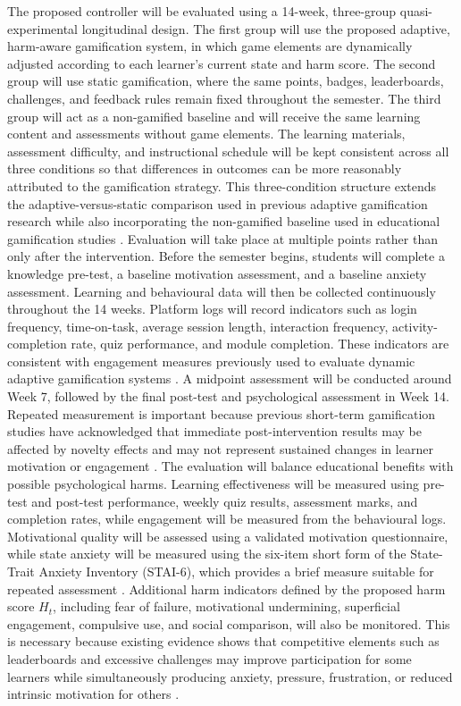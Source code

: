 \documentclass[12pt,a4paper]{article}
\begin{document}
\begin{justify}
The proposed controller will be evaluated using a 14-week, three-group quasi-experimental longitudinal design. The first group will use the proposed adaptive, harm-aware gamification system, in which game elements are dynamically adjusted according to each learner's current state and harm score. The second group will use static gamification, where the same points, badges, leaderboards, challenges, and feedback rules remain fixed throughout the semester. The third group will act as a non-gamified baseline and will receive the same learning content and assessments without game elements. The learning materials, assessment difficulty, and instructional schedule will be kept consistent across all three conditions so that differences in outcomes can be more reasonably attributed to the gamification strategy. This three-condition structure extends the adaptive-versus-static comparison used in previous adaptive gamification research while also incorporating the non-gamified baseline used in educational gamification studies \parencite{shabadurai2025reinforcement,ojonuba2025web}.
Evaluation will take place at multiple points rather than only after the intervention. Before the semester begins, students will complete a knowledge pre-test, a baseline motivation assessment, and a baseline anxiety assessment. Learning and behavioural data will then be collected continuously throughout the 14 weeks. Platform logs will record indicators such as login frequency, time-on-task, average session length, interaction frequency, activity-completion rate, quiz performance, and module completion. These indicators are consistent with engagement measures previously used to evaluate dynamic adaptive gamification systems \parencite{shabadurai2025reinforcement}. A midpoint assessment will be conducted around Week 7, followed by the final post-test and psychological assessment in Week 14. Repeated measurement is important because previous short-term gamification studies have acknowledged that immediate post-intervention results may be affected by novelty effects and may not represent sustained changes in learner motivation or engagement \parencite{zhang2026gamification,ming2025gamification}.
The evaluation will balance educational benefits with possible psychological harms. Learning effectiveness will be measured using pre-test and post-test performance, weekly quiz results, assessment marks, and completion rates, while engagement will be measured from the behavioural logs. Motivational quality will be assessed using a validated motivation questionnaire, while state anxiety will be measured using the six-item short form of the State-Trait Anxiety Inventory (STAI-6), which provides a brief measure suitable for repeated assessment \parencite{marteau1992stai}. Additional harm indicators defined by the proposed harm score $H_t$, including fear of failure, motivational undermining, superficial engagement, compulsive use, and social comparison, will also be monitored. This is necessary because existing evidence shows that competitive elements such as leaderboards and excessive challenges may improve participation for some learners while simultaneously producing anxiety, pressure, frustration, or reduced intrinsic motivation for others \parencite{nugroho2025negative,edwards2022anxiety,durmaz2022gamification}.

\end{justify}
\end{document}
